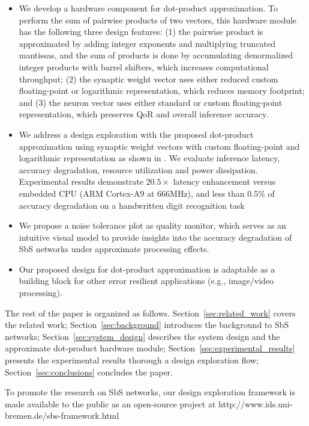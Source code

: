 \begin{itemize}
	\item We develop a hardware component for dot-product approximation. To perform the sum of pairwise products of two vectors, this hardware module has the following three design features: (1) the pairwise product is approximated by adding integer exponents and multiplying truncated mantissas, and the sum of products is done by accumulating denormalized integer products with barrel shifters, which increases computational throughput; (2) the synaptic weight vector uses either reduced custom floating-point or logarithmic representation, which reduces memory footprint; and (3) the neuron vector uses either standard or custom floating-point representation, which preserves QoR and overall inference accuracy.
	\item We address a design exploration with the proposed dot-product approximation using synaptic weight vectors with custom floating-point and logarithmic representation as shown in . We evaluate inference latency, accuracy degradation, resource utilization and power dissipation. Experimental results demonstrate $20.5\times$ latency enhancement versus embedded CPU (ARM Cortex-A9 at $666$MHz), and less than $0.5\%$ of accuracy degradation on a handwritten digit recognition task 
	\item We propose a noise tolerance plot as quality monitor, which serves as an intuitive visual model to provide insights into the accuracy degradation of SbS networks under approximate processing effects.
	\item Our proposed design for dot-product approximation is adaptable as a building block for other error resilient applications (e.g., image/video processing).
\end{itemize}


The rest of the paper is organized as follows. Section~\ref{sec:related_work} covers the related work; Section~\ref{sec:background} introduces the background to SbS networks; Section~\ref{sec:system_design} describes the system design and the approximate dot-product hardware module; Section~\ref{sec:experimental_results} presents the experimental results thorough a design exploration flow; Section~\ref{sec:conclusions} concludes the paper.


To promote the research on SbS networks, our design exploration framework is made available to the public as an open-source project at http://www.ids.uni-bremen.de/sbs-framework.html

